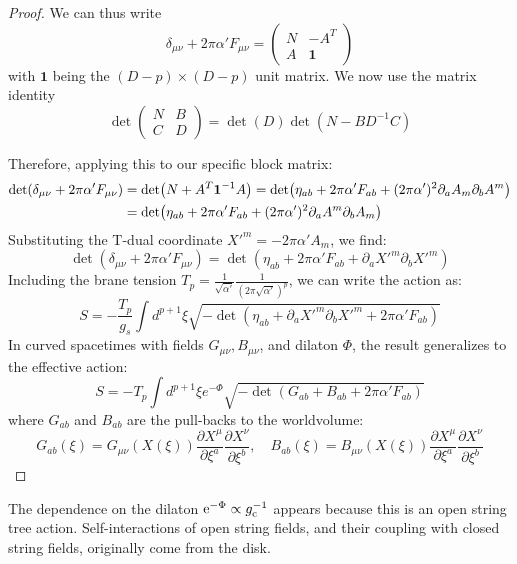 \begin{tcolorbox}[breakable]
\begin{proof}
			We can thus write
			\begin{equation*}
				\delta_{\mu\nu} + 2\pi\alpha' F_{\mu\nu} = \left( \begin{array}{c|c}
					N & -A^T \\ \hline
					A & \mathbf{1}
				\end{array} \right)
			\end{equation*}  
			with $\mathbf{1}$ being the $(D-p) \times (D-p)$ unit matrix. We now use the matrix identity
			\begin{equation*}
				\det \begin{pmatrix} N & B \\ C & D \end{pmatrix} = \det(D) \det(N - B D^{-1} C)
			\end{equation*}  
			
			Therefore, applying this to our specific block matrix:
			\begin{align}
					\det(\delta_{\mu\nu} + 2\pi\alpha' F_{\mu\nu}) &= \det(N + A^T \mathbf{1}^{-1} A) = \det(\eta_{ab} + 2\pi\alpha' F_{ab} + (2\pi\alpha')^2 \partial_a A_m \partial_b A^m)\notag\\
				 &= \det(\eta_{ab} + 2\pi\alpha' F_{ab} + (2\pi\alpha')^2 \partial_a A^m \partial_b A_m) 
			\end{align}
			Substituting the T-dual coordinate $X'^m = -2\pi \alpha' A_m$, we find:
			\begin{equation}
				\det(\delta_{\mu\nu} + 2\pi\alpha' F_{\mu\nu}) = \det(\eta_{ab} + 2\pi\alpha' F_{ab} + \partial_a X'^m \partial_b X'^m) 
			\end{equation}
			Including the brane tension $T_p = \frac{1}{\sqrt{\alpha'}} \frac{1}{(2\pi\sqrt{\alpha'})^p}$, we can write the action as:
			\begin{equation}
				S = -\frac{T_p}{g_s} \int d^{p+1}\xi \sqrt{-\det(\eta_{ab} + \partial_a X'^m \partial_b X'^m + 2\pi \alpha' F_{ab})} 
			\end{equation}
			In curved spacetimes with fields $G_{\mu\nu}, B_{\mu\nu}$, and dilaton $\Phi$, the result generalizes to the effective action:
			\begin{equation}
				S = -T_p \int d^{p+1}\xi e^{-\Phi} \sqrt{-\det(G_{ab} + B_{ab} + 2\pi \alpha' F_{ab})} 
			\end{equation}
			where $G_{ab}$ and $B_{ab}$ are the pull-backs to the worldvolume:
			\begin{equation}
				G_{ab}(\xi) = G_{\mu\nu}(X(\xi)) \frac{\partial X^\mu}{\partial \xi^a} \frac{\partial X^\nu}{\partial \xi^b}, \quad B_{ab}(\xi) = B_{\mu\nu}(X(\xi)) \frac{\partial X^\mu}{\partial \xi^a} \frac{\partial X^\nu}{\partial \xi^b} 
			\end{equation}
	\end{proof}
\end{tcolorbox}
The dependence on the dilaton $\mathrm{e}^{-\Phi} \propto g_{\mathrm{c}}^{-1}$ appears because this is an open string tree action. 
Self-interactions of open string fields, and their coupling with closed string fields, originally come from the disk.

